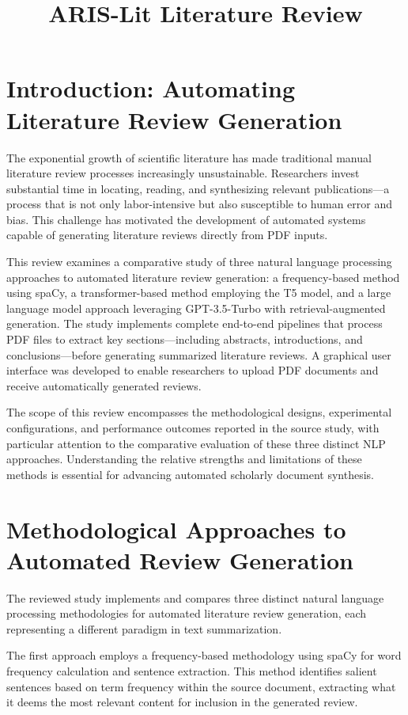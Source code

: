\documentclass{article}
\title{ARIS-Lit Literature Review}
\begin{document}
\maketitle
\section{Introduction: Automating Literature Review Generation}
The exponential growth of scientific literature has made traditional manual literature review processes increasingly unsustainable. Researchers invest substantial time in locating, reading, and synthesizing relevant publications—a process that is not only labor-intensive but also susceptible to human error and bias. This challenge has motivated the development of automated systems capable of generating literature reviews directly from PDF inputs.

This review examines a comparative study of three natural language processing approaches to automated literature review generation: a frequency-based method using spaCy, a transformer-based method employing the T5 model, and a large language model approach leveraging GPT-3.5-Turbo with retrieval-augmented generation. The study implements complete end-to-end pipelines that process PDF files to extract key sections—including abstracts, introductions, and conclusions—before generating summarized literature reviews. A graphical user interface was developed to enable researchers to upload PDF documents and receive automatically generated reviews.

The scope of this review encompasses the methodological designs, experimental configurations, and performance outcomes reported in the source study, with particular attention to the comparative evaluation of these three distinct NLP approaches. Understanding the relative strengths and limitations of these methods is essential for advancing automated scholarly document synthesis.

\section{Methodological Approaches to Automated Review Generation}
The reviewed study implements and compares three distinct natural language processing methodologies for automated literature review generation, each representing a different paradigm in text summarization.

The first approach employs a frequency-based methodology using spaCy for word frequency calculation and sentence extraction. This method identifies salient sentences based on term frequency within the source document, extracting what it deems the most relevant content for inclusion in the generated review.
\end{document}
